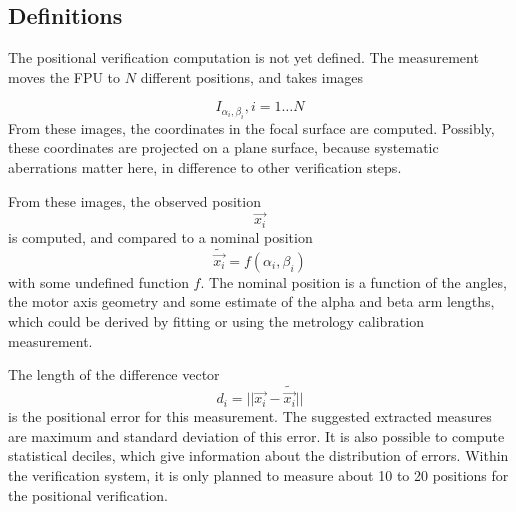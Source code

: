\documentclass[11pt,a4paper,twoside]{scrartcl}
\begin{document}
\subsection{Definitions}

The positional verification computation is not yet defined.
The measurement moves the FPU to $N$ different positions,
and takes images

\[
I_{\alpha_i,\beta_i}, i = 1 \ldots N
\]
From these images, the coordinates in the focal surface are computed.
Possibly, these coordinates are projected on a plane surface,
because systematic aberrations matter here, in difference
to other verification steps.

From these images, the observed position
\[
\vec{x_i}
\]
is computed, and compared to a nominal position
\[
\tilde{\vec{x_i}} = f(\alpha_i,\beta_i)
\]
with some undefined function $f$. The nominal position is a function
of the angles, the motor axis geometry and some estimate of the alpha
and beta arm lengths, which could be derived by fitting or using the
metrology calibration measurement.

The length of the difference vector
\[
d_i = || \vec{x_i} - \tilde{\vec{x_i}}||
\]
is the positional error for this measurement.  The suggested extracted
measures are maximum and standard deviation of this error. It is also
possible to compute statistical deciles, which give information about
the distribution of errors. Within the verification system, it is only
planned to measure about 10 to 20 positions for the positional verification.

\begin{eqnarray}
\end{eqnarray}
\end{document}
